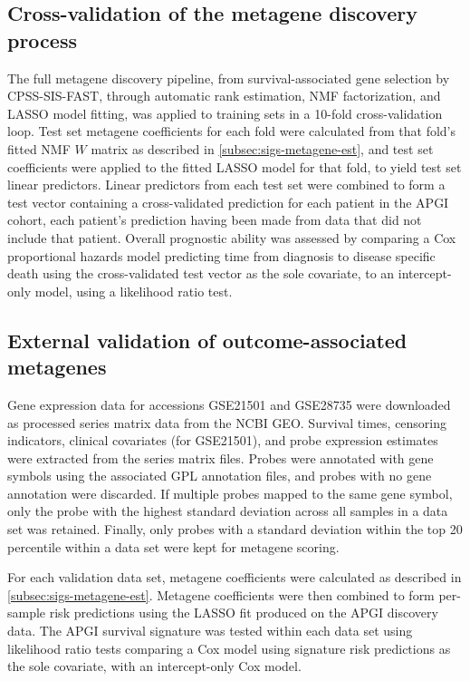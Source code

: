 \documentclass[dissertation.tex]{subfiles}
\begin{document}
\subsection{Cross-validation of the metagene discovery process}
The full metagene discovery pipeline, from survival-associated gene selection by \gls{CPSS}-\gls{SIS}-\gls{FAST}, through automatic rank estimation, \gls{NMF} factorization, and \gls{LASSO} model fitting, was applied to training sets in a 10-fold cross-validation loop.  Test set metagene coefficients for each fold were calculated from that fold's fitted \gls{NMF} $W$ matrix as described in \cref{subsec:sigs-metagene-est}, and test set coefficients were applied to the fitted \gls{LASSO} model for that fold, to yield test set linear predictors.  Linear predictors from each test set were combined to form a test vector containing a cross-validated prediction for each patient in the \gls{APGI} cohort, each patient's prediction having been made from data that did not include that patient.  Overall prognostic ability was assessed by comparing a Cox proportional hazards model predicting time from diagnosis to disease specific death using the cross-validated test vector as the sole covariate, to an intercept-only model, using a likelihood ratio test.

\subsection{External validation of outcome-associated metagenes}
Gene expression data for accessions GSE21501 and GSE28735 were downloaded as processed series matrix data from the \gls{NCBI} \gls{GEO}.  Survival times, censoring indicators, clinical covariates (for GSE21501), and probe expression estimates were extracted from the series matrix files.  Probes were annotated with gene symbols using the associated GPL annotation files, and probes with no gene annotation were discarded.  If multiple probes mapped to the same gene symbol, only the probe with the highest standard deviation across all samples in a data set was retained.  Finally, only probes with a standard deviation within the top 20 percentile within a data set were kept for metagene scoring.

For each validation data set, metagene coefficients were calculated as described in \cref{subsec:sigs-metagene-est}.  Metagene coefficients were then combined to form per-sample risk predictions using the \gls{LASSO} fit produced on the \gls{APGI} discovery data.  The \gls{APGI} survival signature was tested within each data set using likelihood ratio tests comparing a Cox model using signature risk predictions as the sole covariate, with an intercept-only Cox model.
\end{document}
